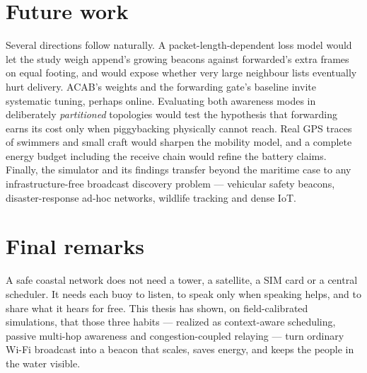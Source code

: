 \documentclass[12pt,a4paper,oneside]{report}
\begin{document}
\section{Future work}
Several directions follow naturally. A packet-length-dependent loss model would
let the study weigh append's growing beacons against forwarded's extra frames on
equal footing, and would expose whether very large neighbour lists eventually
hurt delivery. ACAB's weights and the forwarding gate's baseline invite
systematic tuning, perhaps online. Evaluating both awareness modes in
deliberately \emph{partitioned} topologies would test the hypothesis that
forwarding earns its cost only when piggybacking physically cannot reach. Real
GPS traces of swimmers and small craft would sharpen the mobility model, and a
complete energy budget including the receive chain would refine the battery
claims. Finally, the simulator and its findings transfer beyond the maritime
case to any infrastructure-free broadcast discovery problem --- vehicular safety
beacons, disaster-response ad-hoc networks, wildlife tracking and dense IoT.

\section{Final remarks}
A safe coastal network does not need a tower, a satellite, a SIM card or a
central scheduler. It needs each buoy to listen, to speak only when speaking
helps, and to share what it hears for free. This thesis has shown, on
field-calibrated simulations, that those three habits --- realized as
context-aware scheduling, passive multi-hop awareness and congestion-coupled
relaying --- turn ordinary Wi-Fi broadcast into a beacon that scales, saves
energy, and keeps the people in the water visible.
\end{document}
